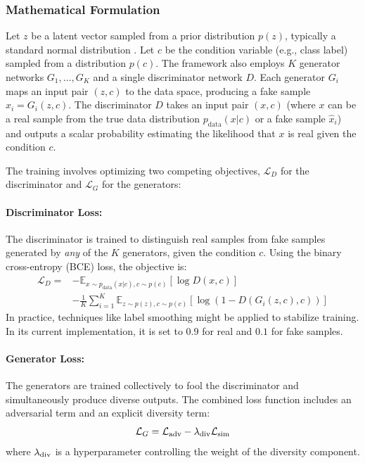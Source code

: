 \subsubsection{Mathematical Formulation}
\label{theoretical_cmadgan_math}

Let \( z \) be a latent vector sampled from a prior distribution \( p(z) \), typically a standard normal distribution . Let \( c \) be the condition variable (e.g., class label) sampled from a distribution \( p(c) \). The framework also employs \( K \) generator networks \( G_1, \dots, G_K \) and a single discriminator network \( D \). Each generator \( G_i \) maps an input pair \( (z, c) \) to the data space, producing a fake sample \( \hat{x}_i = G_i(z, c) \). The discriminator \( D \) takes an input pair \( (x, c) \) (where \( x \) can be a real sample from the true data distribution \( p_{\text{data}}(x|c) \) or a fake sample \( \hat{x}_i \)) and outputs a scalar probability estimating the likelihood that \( x \) is real given the condition \( c \).

The training involves optimizing two competing objectives, \( \mathcal{L}_D \) for the discriminator and \( \mathcal{L}_G \) for the generators:

\paragraph{Discriminator Loss:}
The discriminator is trained to distinguish real samples from fake samples generated by \textit{any} of the \( K \) generators, given the condition \( c \). Using the binary cross-entropy (BCE) loss, the objective is:
\begin{equation}
\label{eq:cmadgan_loss_d}
\begin{split}
\mathcal{L}_D = & - \mathbb{E}_{x \sim p_{\text{data}}(x|c), c \sim p(c)} [\log D(x, c)] \\
& - \frac{1}{K} \sum_{i=1}^{K} \mathbb{E}_{z \sim p(z), c \sim p(c)} [\log(1 - D(G_i(z, c), c))]
\end{split}
\end{equation}
In practice, techniques like label smoothing might be applied to stabilize training. In its current implementation, it is set to \(0.9\) for real and \(0.1\) for fake samples.

\paragraph{Generator Loss:}
The generators are trained collectively to fool the discriminator and simultaneously produce diverse outputs. The combined loss function includes an adversarial term and an explicit diversity term:
\begin{equation}
\label{eq:cmadgan_loss_g}
\mathcal{L}_G = \mathcal{L}_{\text{adv}} - \lambda_{\text{div}} \mathcal{L}_{\text{sim}} 
\end{equation}
where \( \lambda_{\text{div}} \) is a hyperparameter controlling the weight of the diversity component.

